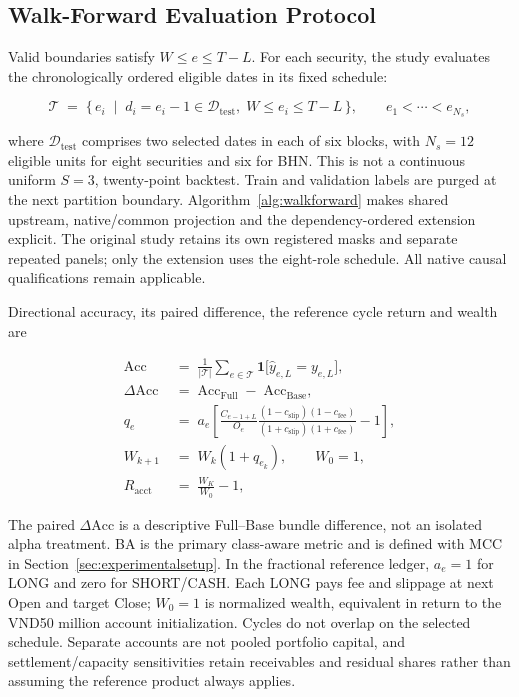 \subsection{Walk-Forward Evaluation Protocol}
Valid boundaries satisfy $W\le e\le T-L$. For each security, the study evaluates the chronologically ordered eligible dates in its fixed schedule:

\begin{equation}
    \mathcal{T} \;=\;
    \bigl\{\, e_i \;\mid\; d_i=e_i-1\in\mathcal{D}_{\mathrm{test}},\;
    W\le e_i\le T-L\,\bigr\},
    \qquad e_1<\cdots<e_{N_s},
    \label{eq:testpoints}
\end{equation}


where $\mathcal{D}_{\mathrm{test}}$ comprises two selected dates in each of six blocks, with $N_s=12$ eligible units for eight securities and six for BHN. This is not a continuous uniform $S=3$, twenty-point backtest. Train and validation labels are purged at the next partition boundary. Algorithm~\ref{alg:walkforward} makes shared upstream, native/common projection and the dependency-ordered extension explicit. The original study retains its own registered masks and separate repeated panels; only the extension uses the eight-role schedule. All native causal qualifications remain applicable.

Directional accuracy, its paired difference, the reference cycle return and wealth are

\begin{align}
    \mathrm{Acc}
    &\;=\;
    \frac{1}{|\mathcal{T}|}
    \sum_{e \in \mathcal{T}}
    \mathbf{1}\!\bigl[\hat{y}_{e,L} = y_{e,L}\bigr],
    \label{eq:acc} \\[4pt]
    \Delta\mathrm{Acc}
    &\;=\;
    \mathrm{Acc}_{\mathrm{Full}}
    \;-\; \mathrm{Acc}_{\mathrm{Base}},
    \label{eq:lift} \\[4pt]
    q_e
    &\;=\;
    a_e\left[
    \frac{C_{e-1+L}}{O_e}
    \frac{(1-c_{\mathrm{slip}})(1-c_{\mathrm{fee}})}
         {(1+c_{\mathrm{slip}})(1+c_{\mathrm{fee}})}-1
    \right],
    \label{eq:execution_return}\\[4pt]
    W_{k+1}
    &\;=\;
    W_k\left(1+q_{e_k}\right),\qquad W_0=1,
    \label{eq:wealth_update}\\[4pt]
    R_{\mathrm{acct}}
    &\;=\;
    \frac{W_K}{W_0}-1,
    \label{eq:account_return}
\end{align}


The paired $\Delta\mathrm{Acc}$ is a descriptive Full--Base bundle difference, not an isolated alpha treatment. BA is the primary class-aware metric and is defined with MCC in Section~\ref{sec:experimentalsetup}. In the fractional reference ledger, $a_e=1$ for LONG and zero for SHORT/CASH. Each LONG pays fee and slippage at next Open and target Close; $W_0=1$ is normalized wealth, equivalent in return to the VND50 million account initialization. Cycles do not overlap on the selected schedule. Separate accounts are not pooled portfolio capital, and settlement/capacity sensitivities retain receivables and residual shares rather than assuming the reference product always applies.

